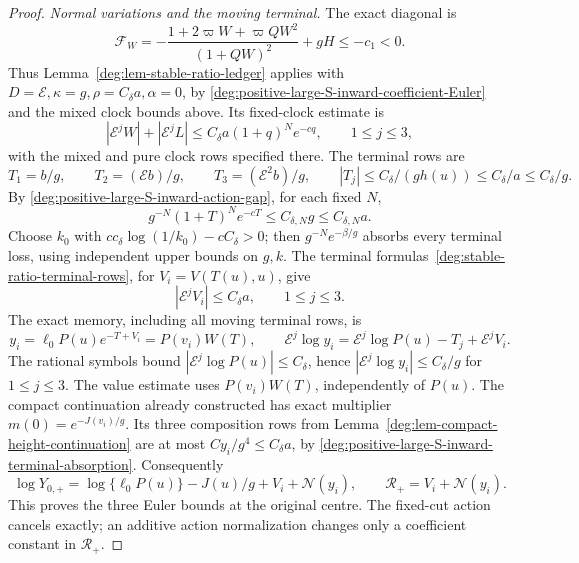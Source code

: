 \begin{proof}
\smallskip
\noindent\emph{Normal variations and the moving terminal.}
The exact diagonal is
\begin{equation}\label{deg:positive-large-S-inward-negative-diagonal}
 \mathscr F_W=-\frac{1+2\varpi W+\varpi QW^2}{(1+QW)^2}+gH
 \le-c_1<0.
\end{equation}
Thus Lemma~\ref{deg:lem-stable-ratio-ledger} applies with
\(D=\mathcal E,\kappa=g,\rho=C_\delta a,\alpha=0\), by
\eqref{deg:positive-large-S-inward-coefficient-Euler} and the mixed
clock bounds above. Its fixed-clock estimate is
\begin{equation}\label{deg:positive-large-S-inward-W-Euler}
 |\mathcal E^jW|+|\mathcal E^jL|
 \le C_\delta a(1+q)^Ne^{-cq},\qquad1\le j\le3,
\end{equation}
with the mixed and pure clock rows specified there. The terminal rows are
\begin{equation}\label{deg:positive-large-S-inward-terminal-clock}
 T_1=b/g,\qquad T_2=(\mathcal E b)/g,\qquad
 T_3=(\mathcal E^2b)/g,\qquad
 |T_j|\le C_\delta/(gh(u))\le C_\delta/a\le C_\delta/g .
\end{equation}
By \eqref{deg:positive-large-S-inward-action-gap}, for each fixed \(N\),
\begin{equation}\label{deg:positive-large-S-inward-terminal-absorption}
 g^{-N}(1+T)^Ne^{-cT}\le C_{\delta,N}g\le C_{\delta,N}a.
\end{equation}
Choose \(k_0\) with \(cc_\delta\log(1/k_0)-cC_\delta>0\);
then \(g^{-N}e^{-\beta/g}\) absorbs every terminal loss, using
independent upper bounds on \(g,k\).
The terminal formulas~\eqref{deg:stable-ratio-terminal-rows}, for
\(V_i=V(T(u),u)\), give
\begin{equation}\label{deg:positive-large-S-inward-V-action3}
 |\mathcal E^jV_i|\le C_\delta a,\qquad1\le j\le3.
\end{equation}
The exact memory, including all moving terminal rows, is
\begin{equation}\label{deg:positive-large-S-inward-height-memory}
 y_i=\ell_0P(u)e^{-T+V_i}=P(v_i)W(T),\qquad
 \mathcal E^j\log y_i=\mathcal E^j\log P(u)-T_j+\mathcal E^jV_i.
\end{equation}
The rational symbols bound \(|\mathcal E^j\log P(u)|\le C_\delta\),
hence \(|\mathcal E^j\log y_i|\le C_\delta/g\) for \(1\le j\le3\).
The value estimate uses \(P(v_i)W(T)\), independently of \(P(u)\).
The compact continuation already constructed has exact multiplier
\(m(0)=e^{-J(v_i)/g}\). Its three composition rows from
Lemma~\ref{deg:lem-compact-height-continuation} are at most
\(Cy_i/g^4\le C_\delta a\), by
\eqref{deg:positive-large-S-inward-terminal-absorption}. Consequently
\[
 \log Y_{0,+}=\log\{\ell_0P(u)\}-J(u)/g+V_i+\mathcal N(y_i),
 \qquad \mathcal R_+=V_i+\mathcal N(y_i).
\]
This proves the three Euler bounds at the original centre. The fixed-cut
action cancels exactly; an additive action normalization changes only a
coefficient constant in \(\mathcal R_+\).


\end{proof}
